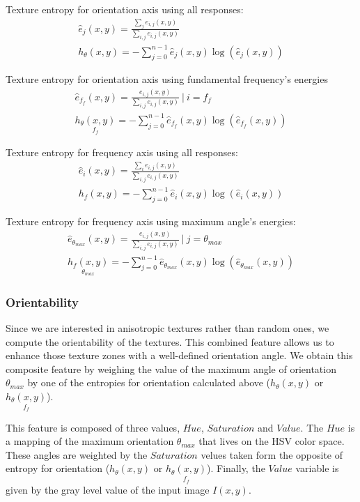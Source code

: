 Texture entropy for orientation axis using all responses:
\begin{gather}
    \hat{e}_{j}(x,y) = \frac{\sum_{j} e_{i,j}(x,y)}{ \sum_{i,j} e_{i,j}(x,y)}\\	
    h_{\theta}(x,y) = -\sum_{j=0}^{n-1} \hat{e}_{j}(x,y)  \log (\hat{e}_{j}(x,y)) \label{eq:entropy_orient}
\end{gather}


Texture entropy for orientation axis using fundamental frequency's energies
\begin{gather}
    \hat{e}_{f_{f}}(x,y) = \frac{e_{i,j}(x,y)}{ \sum_{i,j} e_{i,j}(x,y)} ~|~ i = f_{f}\\	
    \underset{f_{f}}{h_{\theta}(x,y)} = -\sum_{j=0}^{n-1} \hat{e}_{f_{f}}(x,y)  \log (\hat{e}_{f_{f}}(x,y))  \label{eq:entropy_fund_freq}
\end{gather}

Texture entropy for frequency axis using all responses:
\begin{gather}
    \hat{e}_{i}(x,y) = \frac{\sum_{i} e_{i,j}(x,y)}{ \sum_{i,j} e_{i,j}(x,y)}\\	
    h_f(x,y) = -\sum_{j=0}^{n-1} \hat{e}_{i}(x,y)  \log (\hat{e}_{i}(x,y))  \label{eq:entropy_freq}
\end{gather}

Texture entropy for frequency axis using maximum angle's energies:
\begin{gather}
    \hat{e}_{\theta _{max}}(x,y) = \frac{e_{i,j}(x,y)}{ \sum_{i,j} e_{i,j}(x,y)} ~|~ j = \theta _{max}\\	
    \underset{\theta_{max}}{h_{f}(x,y)} = -\sum_{j=0}^{n-1} \hat{e}_{\theta _{max}}(x,y)  \log (\hat{e}_{\theta _{max}}(x,y))  \label{eq:entropy_ang_max}
\end{gather}

\subsubsection{Orientability}
Since we are interested in anisotropic textures rather than random ones, we compute the orientability of the textures. This combined feature allows us to enhance those texture zones with a well-defined orientation angle.
We obtain this composite feature by weighing the value of the maximum angle of orientation $\theta_{max}$ by one of the entropies for orientation calculated above ($h_{\theta}(x,y)$ or $\underset{f_{f}}{h_{\theta}(x,y)}$).

This feature is composed of three values, $Hue$, $Saturation$ and $Value$. The $Hue$ is a mapping of the maximum orientation $\theta_{max}$ that lives on the HSV color space. These angles are weighted by the $Saturation$ velues taken form the opposite of entropy for orientation ($h_{\theta}(x,y)$ or $\underset{f_{f}}{h_{\theta}(x,y)}$). Finally, the $Value$ variable is given by the gray level value of the input image $I(x,y)$.

